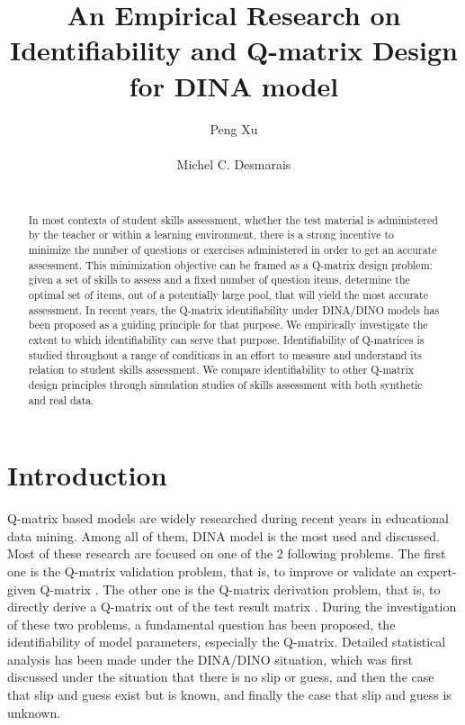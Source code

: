 \documentclass{edm_template}
\begin{document}
\title{An Empirical Research on Identifiability and Q-matrix Design for DINA model}
\author{
\alignauthor
Peng Xu\\
       \\
\alignauthor
Michel C. Desmarais\\
       \\
}
\maketitle

\begin{abstract}
In most contexts of student skills assessment, whether the test material is administered by the teacher or within a learning environment, there is a strong incentive to minimize the number of questions or exercises administered in order to get an accurate assessment.  This minimization objective can be framed as a Q-matrix design problem: given a set of skills to assess and a fixed number of question items, determine the optimal set of items, out of a potentially large pool, that will yield the most accurate assessment.  In recent years, the Q-matrix identifiability under DINA/DINO models has been proposed as a guiding principle for that purpose.  We empirically investigate the extent to which identifiability can serve that purpose. Identifiability of Q-matrices is studied throughout a range of conditions in an effort to measure and understand its relation to student skills assessment.  We compare identifiability to other Q-matrix design principles through simulation studies of skills assessment with both synthetic and real data.
\end{abstract}
\section{Introduction}
Q-matrix based models are widely researched during recent years in educational data mining. Among all of them, DINA model is the most used and discussed. Most of these research are focused on one of the 2 following problems. The first one is the Q-matrix validation problem, that is, to improve or validate an expert-given Q-matrix \cite{de2015general, chiu2013statistical, desmarais2013matrix}. The other one is the Q-matrix derivation problem, that is, to directly derive a Q-matrix out of the test result matrix \cite{barnes2010novel, liu2012data, desmarais2015combining, xu2016boosted}. During the investigation of these two problems, a fundamental question has been proposed, the identifiability of model parameters, especially the Q-matrix. Detailed statistical analysis has been made under the DINA/DINO situation, which was first discussed under the situation that there is no slip or guess, and then the case that slip and guess exist but is known, and finally the case that slip and guess is unknown. 
\end{document}
